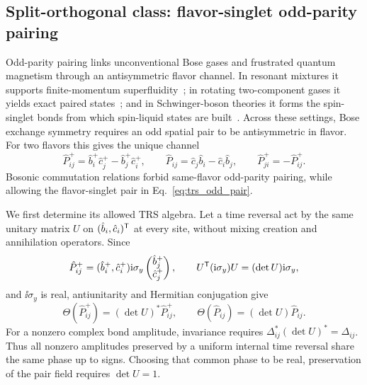 \subsection{Split-orthogonal class: flavor-singlet odd-parity pairing}
\label{app:trs_two_flavor_odd_pairing}

Odd-parity pairing links unconventional Bose gases and frustrated quantum magnetism through an antisymmetric flavor channel. In resonant mixtures it supports finite-momentum superfluidity~\cite{radzihovskyChoi2009pwave,choiRadzihovsky2011finite}; in rotating two-component gases it yields exact paired states~\cite{papenbrockReimannKavoulakis2012pwave}; and in Schwinger-boson theories it forms the spin-singlet bonds from which spin-liquid states are built~\cite{readSachdev1991frustrated,sachdev1992kagome}. Across these settings, Bose exchange symmetry requires an odd spatial pair to be antisymmetric in flavor. For two flavors this gives the unique channel
\begin{equation}
    \hat P_{ij}^+=\hat b_i^+\hat c_j^+-\hat b_j^+\hat c_i^+,
    \qquad \hat P_{ij}=\hat c_j\hat b_i-\hat c_i\hat b_j,
    \qquad \hat P_{ji}^+=-\hat P_{ij}^+.
    \label{eq:trs_odd_pair}
\end{equation}
Bosonic commutation relations forbid same-flavor odd-parity pairing, while allowing the flavor-singlet pair in Eq.~\eqref{eq:trs_odd_pair}.

We first determine its allowed TRS algebra. Let a time reversal act by the same unitary matrix $U$ on $(\hat b_i,\hat c_i)^{\mathsf{T}}$ at every site, without mixing creation and annihilation operators. Since
\begin{equation}
    \hat P_{ij}^+=(\hat b_i^+,\hat c_i^+)\mathrm{i}\sigma_y
                    \begin{pmatrix}\hat b_j^+\\\hat c_j^+\end{pmatrix},
    \qquad
    U^{\mathsf{T}}(\mathrm{i}\sigma_y)U=(\det U)\mathrm{i}\sigma_y,
    \label{eq:trs_two_by_two_determinant_identity}
\end{equation}
and $\ii\sigma_y$ is real, antiunitarity and Hermitian conjugation give
\begin{equation}
    \Theta(\hat P_{ij}^+)=(\det U)^*\hat P_{ij}^+,
    \qquad
    \Theta(\hat P_{ij})=(\det U)\hat P_{ij}.
    \label{eq:trs_odd_pair_determinant_transformation}
\end{equation}
For a nonzero complex bond amplitude, invariance requires $\Delta_{ij}^*(\det U)^*=\Delta_{ij}$. Thus all nonzero amplitudes preserved by a uniform internal time reversal share the same phase up to signs. Choosing that common phase to be real, preservation of the pair field requires $\det U=1$.

